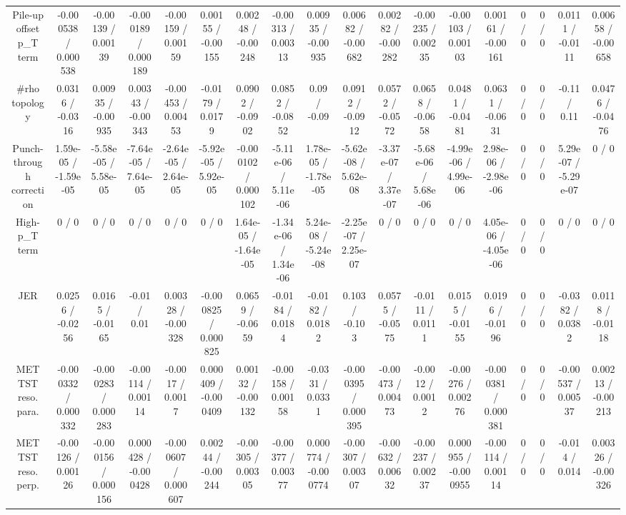 \documentclass[10pt]{article}
\begin{document}
\begin{table}[htbp]
\begin{center}
\begin{tabular}{|c|c|c|c|c|c|c|c|c|c|c|c|c|c|c|c|c|c|}
  Pile-up offset p_{T} term & -0.000538 / 0.000538 & -0.00139 / 0.00139 & -0.000189 / 0.000189 & -0.00159 / 0.00159 & 0.00155 / -0.00155 & 0.00248 / -0.00248 & -0.00313 / 0.00313 & 0.00935 / -0.00935 & 0.00682 / -0.00682 & 0.00282 / -0.00282 & -0.00235 / 0.00235 & -0.00103 / 0.00103 & 0.00161 / -0.00161 & 0 / 0 & 0 / 0 & 0.0111 / -0.0111 & 0.00658 / -0.00658 \\ 
  #rho topology & 0.0316 / -0.0316 & 0.00935 / -0.00935 & 0.00343 / -0.00343 & -0.00453 / 0.00453 & -0.0179 / 0.0179 & 0.0902 / -0.0902 & 0.0852 / -0.0852 & 0.09 / -0.09 & 0.0912 / -0.0912 & 0.0572 / -0.0572 & 0.0658 / -0.0658 & 0.0481 / -0.0481 & 0.0631 / -0.0631 & 0 / 0 & 0 / 0 & -0.11 / 0.11 & 0.0476 / -0.0476 \\ 
  Punch-through correction & 1.59e-05 / -1.59e-05 & -5.58e-05 / 5.58e-05 & -7.64e-05 / 7.64e-05 & -2.64e-05 / 2.64e-05 & -5.92e-05 / 5.92e-05 & -0.000102 / 0.000102 & -5.11e-06 / 5.11e-06 & 1.78e-05 / -1.78e-05 & -5.62e-08 / 5.62e-08 & -3.37e-07 / 3.37e-07 & -5.68e-06 / 5.68e-06 & -4.99e-06 / 4.99e-06 & 2.98e-06 / -2.98e-06 & 0 / 0 & 0 / 0 & 5.29e-07 / -5.29e-07 & 0 / 0 \\ 
  High-p_{T} term & 0 / 0 & 0 / 0 & 0 / 0 & 0 / 0 & 0 / 0 & 1.64e-05 / -1.64e-05 & -1.34e-06 / 1.34e-06 & 5.24e-08 / -5.24e-08 & -2.25e-07 / 2.25e-07 & 0 / 0 & 0 / 0 & 0 / 0 & 4.05e-06 / -4.05e-06 & 0 / 0 & 0 / 0 & 0 / 0 & 0 / 0 \\ 
  JER & 0.0256 / -0.0256 & 0.0165 / -0.0165 & -0.01 / 0.01 & 0.00328 / -0.00328 & -0.000825 / 0.000825 & 0.0659 / -0.0659 & -0.0184 / 0.0184 & -0.0182 / 0.0182 & 0.103 / -0.103 & 0.0575 / -0.0575 & -0.0111 / 0.0111 & 0.0155 / -0.0155 & 0.0196 / -0.0196 & 0 / 0 & 0 / 0 & -0.0382 / 0.0382 & 0.0118 / -0.0118 \\ 
  MET TST reso. para. & -0.000332 / 0.000332 & -0.000283 / 0.000283 & -0.00114 / 0.00114 & -0.0017 / 0.0017 & 0.000409 / -0.000409 & 0.00132 / -0.00132 & -0.00158 / 0.00158 & -0.0331 / 0.0331 & -0.000395 / 0.000395 & -0.00473 / 0.00473 & -0.0012 / 0.0012 & -0.00276 / 0.00276 & -0.000381 / 0.000381 & 0 / 0 & 0 / 0 & -0.00537 / 0.00537 & 0.00213 / -0.00213 \\ 
  MET TST reso. perp. & -0.00126 / 0.00126 & -0.000156 / 0.000156 & 0.000428 / -0.000428 & -0.000607 / 0.000607 & 0.00244 / -0.00244 & -0.00305 / 0.00305 & -0.00377 / 0.00377 & 0.000774 / -0.000774 & -0.00307 / 0.00307 & -0.00632 / 0.00632 & -0.00237 / 0.00237 & 0.000955 / -0.000955 & -0.00114 / 0.00114 & 0 / 0 & 0 / 0 & -0.014 / 0.014 & 0.00326 / -0.00326 \\ 

\end{tabular}
\end{center}
\end{table}
\end{document}
